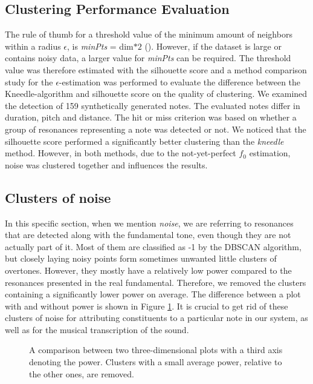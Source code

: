 \subsection{Clustering Performance Evaluation}

The rule of thumb for a threshold value of the minimum amount of neighbors within a radius $\epsilon$, is \textit{minPts} = dim$*2$ (\cite{ester_density-based_1996, sander_density-based_1998}). However, if the dataset is large or contains noisy data, a larger value for \textit{minPts} can be required. The threshold value was therefore estimated with the silhouette score and a method comparison study for the $\epsilon$-estimation was performed to evaluate the difference between the Kneedle-algorithm and silhouette score on the quality of clustering. We examined the detection of 159 synthetically generated notes. The evaluated notes differ in duration, pitch and distance. The hit or miss criterion was based on whether a group of resonances representing a note was detected or not. We noticed that the silhouette score performed a significantly better clustering than the \textit{kneedle} method. However, in both methods, due to the not-yet-perfect $f_0$ estimation, noise was clustered together and influences the results. 

\subsection{Clusters of noise} 
In this specific section, when we mention \textit{noise}, we are referring to resonances that are detected along with the fundamental tone, even though they are not actually part of it. Most of them are classified as -1 by the DBSCAN algorithm, but closely laying noisy points form sometimes unwanted little clusters of overtones. However, they mostly have a relatively low power compared to the resonances presented in the real fundamental. 
Therefore, we removed the clusters containing a significantly lower power on average. The difference between a plot with and without power is shown in Figure \ref{remove_lowpower}. It is crucial to get rid of these clusters of noise for attributing constituents to a particular note in our system, as well as for the musical transcription of the sound.

\begin{figure}[h]
\centering

\caption{A comparison between two three-dimensional plots with a third axis denoting the power. Clusters with a small average power, relative to the other ones, are removed.}
\label{remove_lowpower} 
\end{figure}



